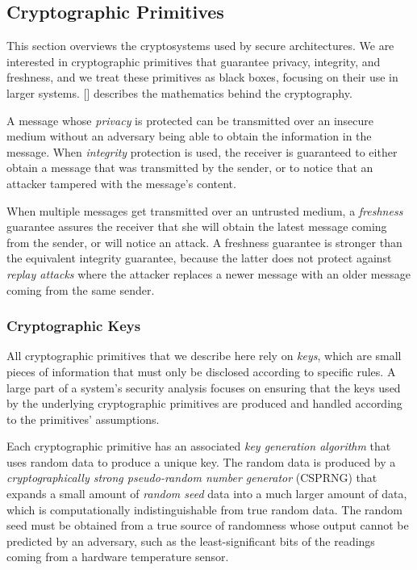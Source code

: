 \subsection{Cryptographic Primitives}

This section overviews the cryptosystems used by secure architectures. We are
interested in cryptographic primitives that guarantee privacy, integrity, and
freshness, and we treat these primitives as black boxes, focusing on their use
in larger systems. [] describes the mathematics behind the cryptography.

A message whose \textit{privacy} is protected can be transmitted over an
insecure medium without an adversary being able to obtain the information in
the message. When \textit{integrity} protection is used, the receiver is
guaranteed to either obtain a message that was transmitted by the sender, or to
notice that an attacker tampered with the message's content.

When multiple messages get transmitted over an untrusted medium, a
\textit{freshness} guarantee assures the receiver that she will obtain the
latest message coming from the sender, or will notice an attack. A freshness
guarantee is stronger than the equivalent integrity guarantee, because the
latter does not protect against \textit{replay attacks} where the attacker
replaces a newer message with an older message coming from the same sender.


\subsubsection{Cryptographic Keys}

All cryptographic primitives that we describe here rely on \textit{keys}, which
are small pieces of information that must only be disclosed according to
specific rules. A large part of a system's security analysis focuses on
ensuring that the keys used by the underlying cryptographic primitives are
produced and handled according to the primitives' assumptions.

Each cryptographic primitive has an associated \textit{key generation
algorithm} that uses random data to produce a unique key. The random data is
produced by a \textit{cryptographically strong pseudo-random number generator}
(CSPRNG) that expands a small amount of \textit{random seed} data into a much
larger amount of data, which is computationally indistinguishable from true
random data. The random seed must be obtained from a true source of randomness
whose output cannot be predicted by an adversary, such as the least-significant
bits of the readings coming from a hardware temperature sensor.

